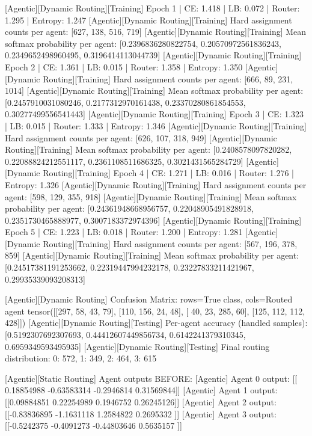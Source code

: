 [Agentic][Dynamic Routing][Training] Epoch 1 | CE: 1.418 | LB: 0.072 | Router: 1.295 | Entropy: 1.247
[Agentic][Dynamic Routing][Training] Hard assignment counts per agent: [627, 138, 516, 719]
[Agentic][Dynamic Routing][Training] Mean softmax probability per agent: [0.2396836280822754, 0.20570972561836243, 0.2349652498960495, 0.3196414113044739]
[Agentic][Dynamic Routing][Training] Epoch 2 | CE: 1.361 | LB: 0.015 | Router: 1.358 | Entropy: 1.350
[Agentic][Dynamic Routing][Training] Hard assignment counts per agent: [666, 89, 231, 1014]
[Agentic][Dynamic Routing][Training] Mean softmax probability per agent: [0.2457910031080246, 0.2177312970161438, 0.23370280861854553, 0.30277499556541443]
[Agentic][Dynamic Routing][Training] Epoch 3 | CE: 1.323 | LB: 0.015 | Router: 1.333 | Entropy: 1.346
[Agentic][Dynamic Routing][Training] Hard assignment counts per agent: [626, 107, 318, 949]
[Agentic][Dynamic Routing][Training] Mean softmax probability per agent: [0.2408578097820282, 0.22088824212551117, 0.2361108511686325, 0.3021431565284729]
[Agentic][Dynamic Routing][Training] Epoch 4 | CE: 1.271 | LB: 0.016 | Router: 1.276 | Entropy: 1.326
[Agentic][Dynamic Routing][Training] Hard assignment counts per agent: [598, 129, 355, 918]
[Agentic][Dynamic Routing][Training] Mean softmax probability per agent: [0.24361948668956757, 0.22048905491828918, 0.2351730465888977, 0.3007183372974396]
[Agentic][Dynamic Routing][Training] Epoch 5 | CE: 1.223 | LB: 0.018 | Router: 1.200 | Entropy: 1.281
[Agentic][Dynamic Routing][Training] Hard assignment counts per agent: [567, 196, 378, 859]
[Agentic][Dynamic Routing][Training] Mean softmax probability per agent: [0.24517381191253662, 0.22319447994232178, 0.23227833211421967, 0.29935339093208313]

[Agentic][Dynamic Routing] Confusion Matrix: rows=True class, cols=Routed agent
tensor([[297,  58,  43,  79],
[110, 156,  24,  48],
[ 40,  23, 285,  60],
[125, 112, 112, 428]])
[Agentic][Dynamic Routing][Testing] Per-agent accuracy (handled samples): [0.5192307692307693, 0.44412607449856734, 0.6142241379310345, 0.6959349593495935]
[Agentic][Dynamic Routing][Testing] Final routing distribution: {0: 572, 1: 349, 2: 464, 3: 615}

[Agentic][Static Routing] Agent outputs BEFORE:
[Agentic] Agent 0 output: [[ 0.18854988 -0.63583314 -0.2946814   0.31569844]]
[Agentic] Agent 1 output: [[0.09884851 0.22254989 0.1946752  0.26245126]]
[Agentic] Agent 2 output: [[-0.83836895 -1.1631118   1.2584822   0.2695332 ]]
[Agentic] Agent 3 output: [[-0.5242375  -0.4091273  -0.44803646  0.5635157 ]]

